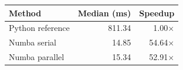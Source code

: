 \begin{tabular*}{\linewidth}{@{\extracolsep{\fill}}lrr}
\toprule
Method & Median (ms) & Speedup \\
\midrule
Python reference & 811.34 & 1.00$\times$ \\
Numba serial & 14.85 & 54.64$\times$ \\
Numba parallel & 15.34 & 52.91$\times$ \\
\bottomrule
\end{tabular*}
